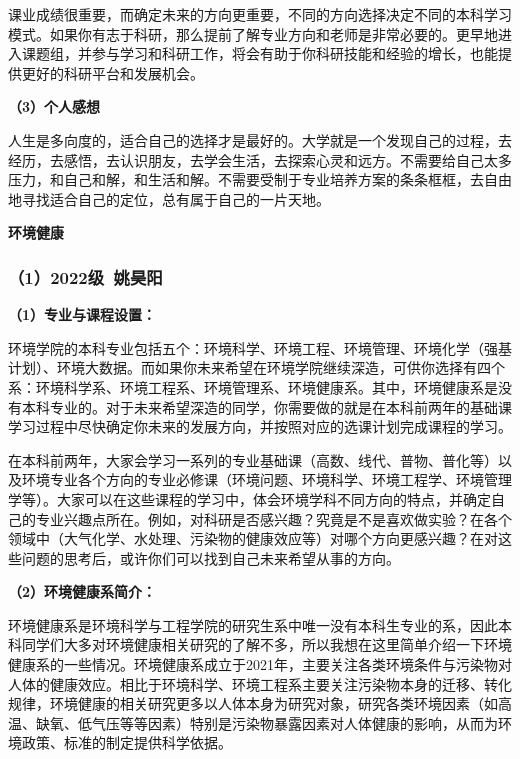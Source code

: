 \vspace{10pt}

课业成绩很重要，而确定未来的方向更重要，不同的方向选择决定不同的本科学习模式。如果你有志于科研，那么提前了解专业方向和老师是非常必要的。更早地进入课题组，并参与学习和科研工作，将会有助于你科研技能和经验的增长，也能提供更好的科研平台和发展机会。

\vspace{10pt}

\textbf{（3）个人感想}

人生是多向度的，适合自己的选择才是最好的。大学就是一个发现自己的过程，去经历，去感悟，去认识朋友，去学会生活，去探索心灵和远方。不需要给自己太多压力，和自己和解，和生活和解。不需要受制于专业培养方案的条条框框，去自由地寻找适合自己的定位，总有属于自己的一片天地。

\vspace{10pt}

\textbf{环境健康}

\subsubsection{（1）2022级\ 姚昊阳}

\textbf{（1）专业与课程设置：}

环境学院的本科专业包括五个：环境科学、环境工程、环境管理、环境化学（强基计划）、环境大数据。而如果你未来希望在环境学院继续深造，可供你选择有四个系：环境科学系、环境工程系、环境管理系、环境健康系。其中，环境健康系是没有本科专业的。对于未来希望深造的同学，你需要做的就是在本科前两年的基础课学习过程中尽快确定你未来的发展方向，并按照对应的选课计划完成课程的学习。

\vspace{10pt}

在本科前两年，大家会学习一系列的专业基础课（高数、线代、普物、普化等）以及环境专业各个方向的专业必修课（环境问题、环境科学、环境工程学、环境管理学等）。大家可以在这些课程的学习中，体会环境学科不同方向的特点，并确定自己的专业兴趣点所在。例如，对科研是否感兴趣？究竟是不是喜欢做实验？在各个领域中（大气化学、水处理、污染物的健康效应等）对哪个方向更感兴趣？在对这些问题的思考后，或许你们可以找到自己未来希望从事的方向。

\vspace{10pt}

\textbf{（2）环境健康系简介：}

环境健康系是环境科学与工程学院的研究生系中唯一没有本科生专业的系，因此本科同学们大多对环境健康相关研究的了解不多，所以我想在这里简单介绍一下环境健康系的一些情况。环境健康系成立于2021年，主要关注各类环境条件与污染物对人体的健康效应。相比于环境科学、环境工程系主要关注污染物本身的迁移、转化规律，环境健康的相关研究更多以人体本身为研究对象，研究各类环境因素（如高温、缺氧、低气压等等因素）特别是污染物暴露因素对人体健康的影响，从而为环境政策、标准的制定提供科学依据。

